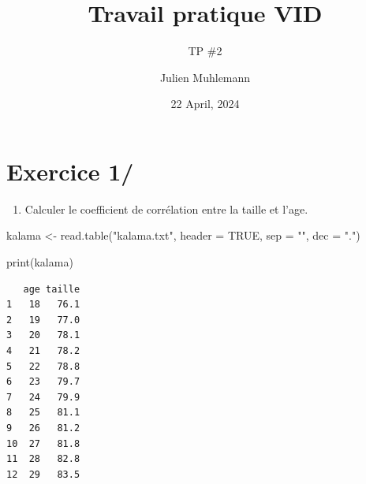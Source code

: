 \documentclass[
  letterpaper,
  DIV=11,
  numbers=noendperiod]{scrartcl}
\title{Travail pratique VID}
\subtitle{TP \#2}
\author{Julien Muhlemann}
\date{22 April, 2024}
\newenvironment{Shaded}{}{}
\newcommand{\AttributeTok}[1]{\textcolor[rgb]{0.84,0.23,0.29}{#1}}
\newcommand{\ConstantTok}[1]{\textcolor[rgb]{0.00,0.36,0.77}{#1}}
\newcommand{\FunctionTok}[1]{\textcolor[rgb]{0.44,0.26,0.76}{#1}}
\newcommand{\NormalTok}[1]{\textcolor[rgb]{0.14,0.16,0.18}{#1}}
\newcommand{\OtherTok}[1]{\textcolor[rgb]{0.44,0.26,0.76}{#1}}
\newcommand{\SpecialCharTok}[1]{\textcolor[rgb]{0.00,0.36,0.77}{#1}}
\newcommand{\StringTok}[1]{\textcolor[rgb]{0.01,0.18,0.38}{#1}}
\providecommand{\tightlist}{%
  \setlength{\itemsep}{0pt}\setlength{\parskip}{0pt}}\usepackage{longtable,booktabs,array}
\renewcommand*\contentsname{Table of contents}
\newcommand\contentsname{Table of contents}
\begin{document}
\maketitle
\ifdefined\Shaded\renewenvironment{Shaded}{\begin{tcolorbox}[borderline west={3pt}{0pt}{shadecolor}, enhanced, frame hidden, interior hidden, sharp corners, boxrule=0pt, breakable]}{\end{tcolorbox}}\fi

\renewcommand*\contentsname{Table of contents}
{
\hypersetup{linkcolor=}
\setcounter{tocdepth}{3}
\tableofcontents
}
\hypertarget{exercice-1}{%
\section{Exercice 1/}\label{exercice-1}}

\begin{enumerate}
\def\labelenumi{\alph{enumi})}
\tightlist
\item
  Calculer le coefficient de corrélation entre la taille et l'age.
\end{enumerate}

\begin{Shaded}
\begin{Highlighting}[]
\NormalTok{kalama }\OtherTok{\textless{}{-}} \FunctionTok{read.table}\NormalTok{(}\StringTok{"kalama.txt"}\NormalTok{, }\AttributeTok{header =} \ConstantTok{TRUE}\NormalTok{, }\AttributeTok{sep =} \StringTok{""}\NormalTok{, }\AttributeTok{dec =} \StringTok{"."}\NormalTok{)}

\FunctionTok{print}\NormalTok{(kalama)}
\end{Highlighting}
\end{Shaded}

\begin{verbatim}
   age taille
1   18   76.1
2   19   77.0
3   20   78.1
4   21   78.2
5   22   78.8
6   23   79.7
7   24   79.9
8   25   81.1
9   26   81.2
10  27   81.8
11  28   82.8
12  29   83.5
\end{verbatim}

\begin{Shaded}
\end{Shaded}
\end{document}
